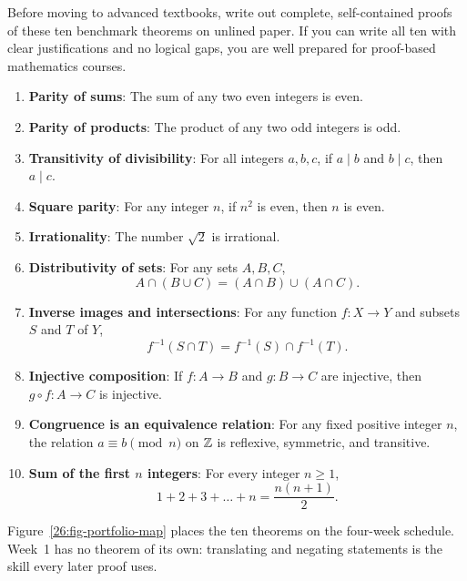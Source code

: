 Before moving to advanced textbooks, write out complete, self-contained proofs of these ten benchmark theorems on unlined paper. If you can write all ten with clear justifications and no logical gaps, you are well prepared for proof-based mathematics courses.

\begin{enumerate}
\item \textbf{Parity of sums}: The sum of any two even integers is even.
\item \textbf{Parity of products}: The product of any two odd integers is odd.
\item \textbf{Transitivity of divisibility}: For all integers $a, b, c$, if $a \mid b$ and $b \mid c$, then $a \mid c$.
\item \textbf{Square parity}: For any integer $n$, if $n^2$ is even, then $n$ is even.
\item \textbf{Irrationality}: The number $\sqrt{2}$ is irrational.
\item \textbf{Distributivity of sets}: For any sets $A, B, C$,
\[
A \cap (B \cup C) = (A \cap B) \cup (A \cap C).
\]
\item \textbf{Inverse images and intersections}: For any function $f: X \to Y$ and subsets $S$ and $T$ of $Y$,
\[
f^{-1}(S \cap T) = f^{-1}(S) \cap f^{-1}(T).
\]
\item \textbf{Injective composition}: If $f: A \to B$ and $g: B \to C$ are injective, then $g \circ f: A \to C$ is injective.
\item \textbf{Congruence is an equivalence relation}: For any fixed positive integer $n$, the relation $a \equiv b \pmod n$ on $\mathbb{Z}$ is reflexive, symmetric, and transitive.
\item \textbf{Sum of the first $n$ integers}: For every integer $n \ge 1$,
\[
1 + 2 + 3 + \dots + n = \frac{n(n+1)}{2}.
\]
\end{enumerate}

Figure~\ref{26:fig-portfolio-map} places the ten theorems on the four-week schedule. Week~1 has no theorem of its own: translating and negating statements is the skill every later proof uses.

